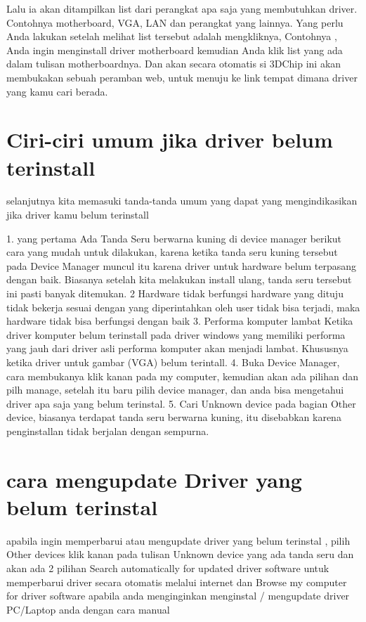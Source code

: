 Lalu ia akan ditampilkan list dari perangkat apa saja yang membutuhkan driver. Contohnya motherboard, VGA, LAN dan perangkat yang lainnya. Yang perlu Anda lakukan setelah melihat list tersebut adalah mengkliknya, Contohnya , Anda ingin menginstall driver motherboard kemudian Anda klik  list yang ada  dalam tulisan motherboardnya. Dan akan secara otomatis si 3DChip ini akan membukakan sebuah peramban web, untuk menuju ke link tempat dimana driver yang kamu cari berada.


\section{Ciri-ciri umum jika driver belum terinstall}
selanjutnya kita memasuki tanda-tanda umum yang dapat yang mengindikasikan jika driver kamu belum terinstall

1. yang pertama Ada Tanda Seru berwarna kuning di device manager
berikut  cara yang mudah untuk dilakukan, karena ketika tanda seru kuning  tersebut pada Device Manager muncul itu karena driver untuk hardware belum terpasang dengan baik. Biasanya setelah kita melakukan install ulang, tanda seru tersebut ini pasti banyak ditemukan. 
2 Hardware tidak berfungsi
 hardware yang dituju tidak  bekerja sesuai dengan yang diperintahkan oleh user tidak bisa terjadi, maka hardware tidak bisa berfungsi dengan baik
3. Performa komputer lambat
Ketika driver komputer belum terinstall pada driver windows yang memiliki performa yang jauh dari driver asli performa komputer akan menjadi lambat. Khususnya ketika driver untuk gambar (VGA) belum terintall. 
4. Buka Device Manager, cara membukanya klik kanan pada my computer, kemudian akan ada pilihan dan pilh manage, setelah itu baru pilih device manager, dan anda bisa mengetahui driver apa saja yang belum terinstal.
5. Cari Unknown device pada bagian Other device, biasanya terdapat tanda seru berwarna kuning, itu disebabkan karena penginstallan tidak berjalan dengan sempurna.

\section{cara mengupdate Driver yang belum terinstal}

apabila ingin memperbarui atau mengupdate driver yang belum terinstal , pilih Other devices klik kanan pada tulisan Unknown device yang ada tanda seru dan akan ada 2 pilihan Search automatically for updated driver software untuk memperbarui driver secara otomatis melalui internet dan Browse my computer for driver software apabila anda menginginkan menginstal / mengupdate driver PC/Laptop anda dengan cara manual

